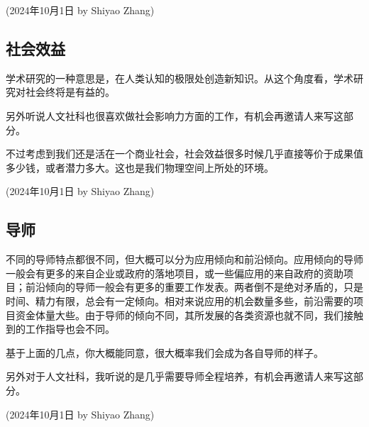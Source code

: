 \begin{flushright}
    (2024年10月1日 by Shiyao Zhang)
\end{flushright}


\subsection{社会效益}
学术研究的一种意思是，在人类认知的极限处创造新知识。从这个角度看，学术研究对社会终将是有益的。

另外听说人文社科也很喜欢做社会影响力方面的工作，有机会再邀请人来写这部分。

不过考虑到我们还是活在一个商业社会，社会效益很多时候几乎直接等价于成果值多少钱，或者潜力多大。这也是我们物理空间上所处的环境。

\begin{flushright}
    (2024年10月1日 by Shiyao Zhang)
\end{flushright}


\subsection{导师}
不同的导师特点都很不同，但大概可以分为应用倾向和前沿倾向。应用倾向的导师一般会有更多的来自企业或政府的落地项目，或一些偏应用的来自政府的资助项目；前沿倾向的导师一般会有更多的重要工作发表。两者倒不是绝对矛盾的，只是时间、精力有限，总会有一定倾向。相对来说应用的机会数量多些，前沿需要的项目资金体量大些。由于导师的倾向不同，其所发展的各类资源也就不同，我们接触到的工作指导也会不同。

基于上面的几点，你大概能同意，很大概率我们会成为各自导师的样子。

另外对于人文社科，我听说的是几乎需要导师全程培养，有机会再邀请人来写这部分。

\begin{flushright}
    (2024年10月1日 by Shiyao Zhang)
\end{flushright}